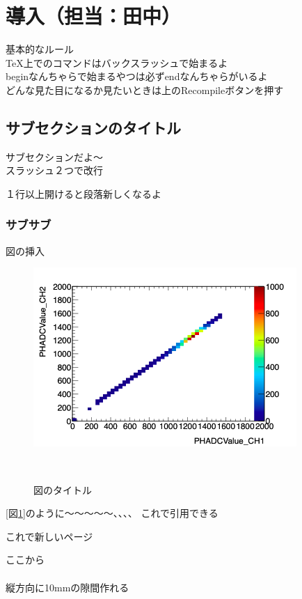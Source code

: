 \documentclass[a4paper,11pt,dvipdfmx]{jsarticle}
\begin{document}

\section{\LARGE{導入（担当：田中）}}
基本的なルール\\
TeX上でのコマンドはバックスラッシュで始まるよ\\
beginなんちゃらで始まるやつは必ずendなんちゃらがいるよ\\
どんな見た目になるか見たいときは上のRecompileボタンを押す

\subsection{サブセクションのタイトル}
サブセクションだよ〜\\
スラッシュ２つで改行

１行以上開けると段落新しくなるよ

\subsubsection{サブサブ}
図の挿入\\

\begin{figure}[H]
\centering %
\includegraphics[width=100mm]{picture/daq/2ch2d.png} %
\caption{図のタイトル} %
\label{2dhist}　%
\end{figure}

[図\ref{2dhist}]のように〜〜〜〜〜、、、、
これで引用できる

\newpage
これで新しいページ

ここから\\
\vspace*{10mm}\\
縦方向に10mmの隙間作れる\\
\end{document}
